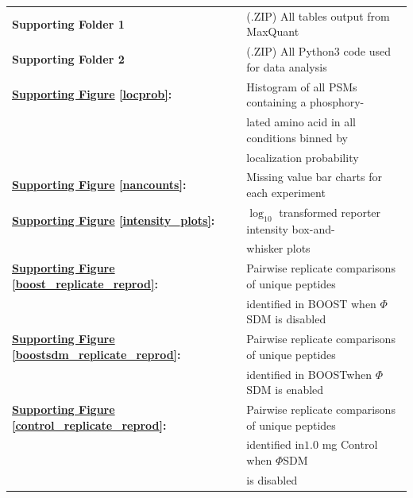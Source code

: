 \documentclass[journal=jprobs,manuscript=article]{achemso}
\begin{document}
\begin{table}[h!]
\begin{tabular}{ll}
	\textbf{Supporting Folder 1} & (.ZIP) All tables output from MaxQuant \\

	\textbf{Supporting Folder 2} & (.ZIP) All Python3 code used for data analysis \\

        \textbf{\hyperref[locprob]{Supporting Figure} \ref{locprob}:} & Histogram of all PSMs containing a phosphory- \\
                                                                                                                & lated amino acid in all conditions binned by \\
                                                                                                                & localization probability \\

       \textbf{\hyperref[nancounts]{Supporting Figure} \ref{nancounts}:} & Missing value bar charts for each experiment \\

        \textbf{\hyperref[intensity_plots]{Supporting Figure} \ref{intensity_plots}:} & $\log_{10}$ transformed reporter intensity box-and- \\
                                                                                                                                   & whisker plots \\
        
        \textbf{\hyperref[boost_replicate_reprod]{Supporting Figure} \ref{boost_replicate_reprod}:} & Pairwise replicate comparisons of unique peptides  \\
                                                                                                                                                                    &  identified in BOOST when $\Phi$SDM is disabled \\

        \textbf{\hyperref[boostsdm_replicate_reprod]{Supporting Figure} \ref{boostsdm_replicate_reprod}:} & Pairwise replicate comparisons of unique peptides  \\
                                                                                                                                                                    &  identified in BOOSTwhen $\Phi$SDM is enabled \\

        \textbf{\hyperref[control_replicate_reprod]{Supporting Figure} \ref{control_replicate_reprod}:} & Pairwise replicate comparisons of unique peptides  \\
                                                                                                                                                                    &  identified in$1.0$ mg Control when $\Phi$SDM\\
                                                                                                                                                                    &  is disabled \\


\end{tabular}
\end{table}
\end{document}
